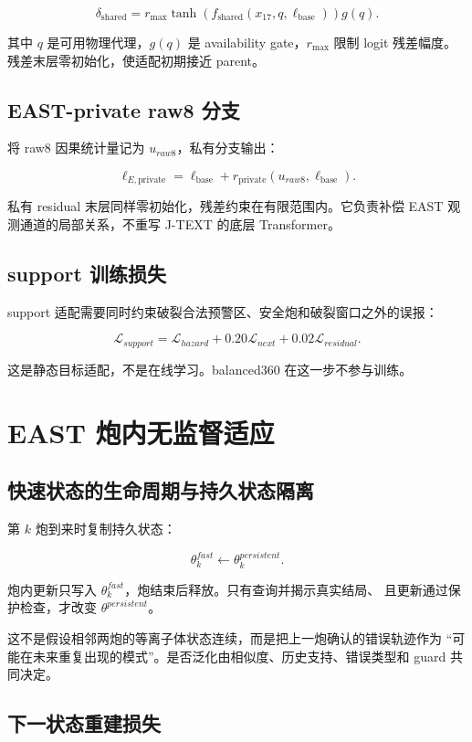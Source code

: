 \documentclass[11pt,a4paper]{article}
\begin{document}
\[
\delta_{\mathrm{shared}}
=r_{\max}\tanh
\left(f_{\mathrm{shared}}(x_{17},q,\ell_{\mathrm{base}})\right)
g(q).
\]

其中 \(q\) 是可用物理代理，\(g(q)\) 是 availability gate，\(r_{\max}\) 限制
logit 残差幅度。残差末层零初始化，使适配初期接近 parent。

\subsection{EAST-private raw8 分支}

将 raw8 因果统计量记为 \(u_{raw8}\)，私有分支输出：

\[
\ell_{E,\mathrm{private}}
=\ell_{\mathrm{base}}+
r_{\mathrm{private}}(u_{raw8},\ell_{\mathrm{base}}).
\]

私有 residual 末层同样零初始化，残差约束在有限范围内。它负责补偿 EAST
观测通道的局部关系，不重写 J-TEXT 的底层 Transformer。

\subsection{support 训练损失}

support 适配需要同时约束破裂合法预警区、安全炮和破裂窗口之外的误报：

\[
\mathcal{L}_{support}
=\mathcal{L}_{hazard}
+0.20\mathcal{L}_{next}
+0.02\mathcal{L}_{residual}.
\]

这是静态目标适配，不是在线学习。balanced360 在这一步不参与训练。

\section{EAST 炮内无监督适应}

\subsection{快速状态的生命周期与持久状态隔离}

第 \(k\) 炮到来时复制持久状态：

\[
\theta^{fast}_k\leftarrow\theta^{persistent}_k.
\]

炮内更新只写入 \(\theta^{fast}_k\)，炮结束后释放。只有查询并揭示真实结局、
且更新通过保护检查，才改变 \(\theta^{persistent}\)。

这不是假设相邻两炮的等离子体状态连续，而是把上一炮确认的错误轨迹作为
“可能在未来重复出现的模式”。是否泛化由相似度、历史支持、错误类型和 guard
共同决定。

\subsection{下一状态重建损失}
\end{document}
